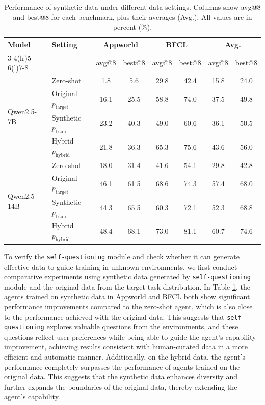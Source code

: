 \begin{table}[htbp]
    \centering
    \caption{Performance of synthetic data under different data settings. Columns show avg@8 and best@8 for each benchmark, plus their averages (Avg.). All values are in percent (\%).}
    \label{tab:performance-synthetic-data}
    \small
    \begin{tabular}{llcccccc}
    \toprule
         \textbf{Model} & \textbf{Setting} & \multicolumn{2}{c}{\textbf{Appworld}} & \multicolumn{2}{c}{\textbf{BFCL}} & \multicolumn{2}{c}{\textbf{Avg.}} \\ 
         \cmidrule(lr){3-4}\cmidrule(lr){5-6}\cmidrule(l){7-8}
         &  & avg@8 & best@8 & avg@8 & best@8 & avg@8 & best@8  \\ 
    \midrule
        \multirow{4}{*}{Qwen2.5-7B} & Zero-shot & 1.8 & 5.6 & 29.8  & 42.4 & 15.8 & 24.0 \\ 
         & Original $p_\mathrm{target}$  & 16.1 & 25.5 & 58.8 & 74.0 & 37.5  & 49.8  \\ 
         & Synthetic $p_\mathrm{train}$ & 23.2 & 40.3 & 49.0 & 60.6 & 36.1 &  50.5 \\ 
         & Hybrid $p_\mathrm{hybrid}$      & 21.8 & 36.3 & 65.3 & 75.6 & 43.6  & 56.0 \\ 
    \midrule
        \multirow{4}{*}{Qwen2.5-14B} & Zero-shot & 18.0  & 31.4  & 41.6 & 54.1 & 29.8 & 42.8 \\ 
         & Original $p_\mathrm{target}$  & 46.1  & 61.5  & 68.6 & 74.3 & 57.4 & 68.0 \\ 
         & Synthetic $p_\mathrm{train}$ & 44.3  & 65.5  & 60.3 & 72.1 & 52.3 & 68.8 \\ 
         & Hybrid $p_\mathrm{hybrid}$       & 48.4 & 68.1  & 73.0 & 81.1 & 60.7  & 74.6 \\ 
    \bottomrule
    \end{tabular}
\end{table}

To verify the \texttt{self-questioning} module and check whether it can generate effective data to guide training in unknown environments, we first conduct comparative experiments using synthetic data generated by \texttt{self-questioning} module and the original data from the target task distribution. In Table \ref{tab:performance-synthetic-data}, the agents trained on synthetic data in Appworld and BFCL both show significant performance improvements compared to the zero-shot agent, which is also close to the performance achieved with the original data. This suggests that \texttt{self-questioning} explores valuable questions from the environments, and these questions reflect user preferences while being able to guide the agent's capability improvement, achieving results consistent with human-curated data in a more efficient and automatic manner.
Additionally, on the hybrid data, the agent's performance completely surpasses the performance of agents trained on the original data. This suggests that the synthetic data enhances diversity and further expands the boundaries of the original data, thereby extending the agent's capability.


